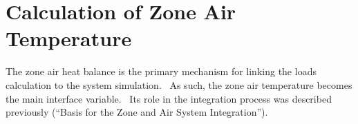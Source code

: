 \section{Calculation of Zone Air Temperature}\label{calculation-of-zone-air-temperature}

The zone air heat balance is the primary mechanism for linking the loads calculation to the system simulation.~ As such, the zone air temperature becomes the main interface variable.~ Its role in the integration process was described previously (``Basis for the Zone and Air System Integration'').
